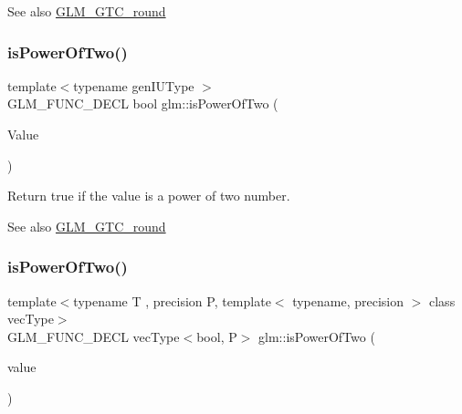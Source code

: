 \begin{DoxySeeAlso}{See also}
\hyperlink{group__gtc__round}{G\+L\+M\+\_\+\+G\+T\+C\+\_\+round} 
\end{DoxySeeAlso}
\mbox{\label{group__gtc__round_gaebf826fbb6e0a70eeaab0792d89b25ec}} 
\subsubsection{\texorpdfstring{is\+Power\+Of\+Two()}{isPowerOfTwo()}\hspace{0.1cm}{\footnotesize\ttfamily [1/2]}}
{\footnotesize\ttfamily template$<$typename gen\+I\+U\+Type $>$ \\
G\+L\+M\+\_\+\+F\+U\+N\+C\+\_\+\+D\+E\+CL bool glm\+::is\+Power\+Of\+Two (\begin{DoxyParamCaption}\item[{gen\+I\+U\+Type}]{Value }\end{DoxyParamCaption})}

Return true if the value is a power of two number.

\begin{DoxySeeAlso}{See also}
\hyperlink{group__gtc__round}{G\+L\+M\+\_\+\+G\+T\+C\+\_\+round} 
\end{DoxySeeAlso}
\mbox{\label{group__gtc__round_gad454e4c8d8cd73ddc7de855f733a1465}} 
\subsubsection{\texorpdfstring{is\+Power\+Of\+Two()}{isPowerOfTwo()}\hspace{0.1cm}{\footnotesize\ttfamily [2/2]}}
{\footnotesize\ttfamily template$<$typename T , precision P, template$<$ typename, precision $>$ class vec\+Type$>$ \\
G\+L\+M\+\_\+\+F\+U\+N\+C\+\_\+\+D\+E\+CL vec\+Type$<$bool, P$>$ glm\+::is\+Power\+Of\+Two (\begin{DoxyParamCaption}\item[{vec\+Type$<$ T, P $>$ const \&}]{value }\end{DoxyParamCaption})}

